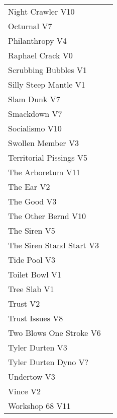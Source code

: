 \begin{center}
\begin{supertabular}{lr}
Night Crawler V10 & \pageref{rt:Night Crawler} \\
Octurnal V7 & \pageref{rt:Octurnal} \\
Philanthropy V4 & \pageref{rt:Philanthropy} \\
Raphael Crack V0 & \pageref{rt:Raphael Crack} \\
Scrubbing Bubbles V1 & \pageref{rt:Scrubbing Bubbles} \\
Silly Steep Mantle V1 & \pageref{rt:Silly Steep Mantle} \\
Slam Dunk V7 & \pageref{rt:Slam Dunk} \\
Smackdown V7 & \pageref{rt:Smackdown} \\
Socialismo V10 & \pageref{rt:Socialismo} \\
Swollen Member V3 & \pageref{rt:Swollen Member} \\
Territorial Pissings V5 & \pageref{rt:Territorial Pissings} \\
The Arboretum V11 & \pageref{rt:The Arboretum} \\
The Ear V2 & \pageref{rt:The Ear} \\
The Good V3 & \pageref{rt:The Good} \\
The Other Bernd V10 & \pageref{rt:The Other Bernd} \\
The Siren V5 & \pageref{rt:The Siren} \\
The Siren Stand Start V3 & \pageref{vr:The Siren Stand Start} \\
Tide Pool V3 & \pageref{rt:Tide Pool} \\
Toilet Bowl V1 & \pageref{rt:Toilet Bowl} \\
Tree Slab V1 & \pageref{rt:Tree Slab} \\
Trust V2 & \pageref{rt:Trust} \\
Trust Issues V8 & \pageref{rt:Trust Issues} \\
Two Blows One Stroke V6 & \pageref{rt:Two Blows One Stroke} \\
Tyler Durten V3 & \pageref{rt:Tyler Durten} \\
Tyler Durten Dyno V? & \pageref{vr:Tyler Durten Dyno} \\
Undertow V3 & \pageref{rt:Undertow} \\
Vince V2 & \pageref{rt:Vince} \\
Workshop 68 V11 & \pageref{rt:Workshop 68} \\
\end{supertabular}
\end{center}
